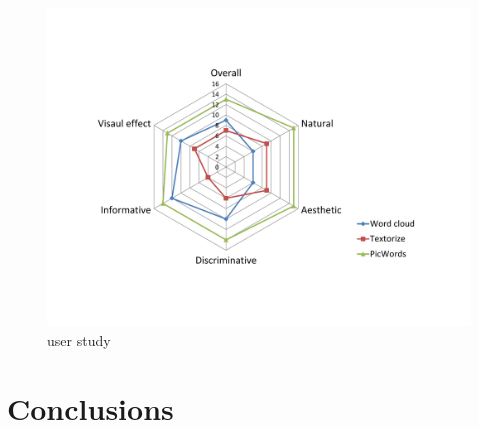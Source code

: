 \documentclass[letter]{sig-alternate}
\begin{document}
\begin{figure}[t]
\begin{center}
\includegraphics[scale=0.35]{figure/baseline2.pdf}
\caption{\small{user study}}
\label{fig:firstfig}
\end{center}
\end{figure}















\section{Conclusions} \label{sec:conclusion}








\end{document}
